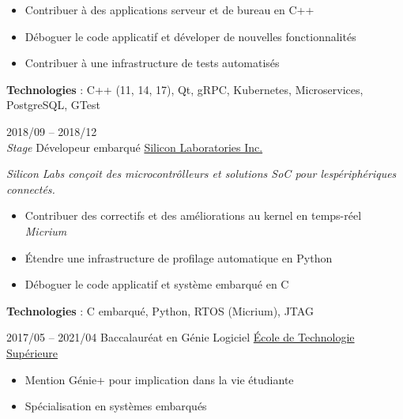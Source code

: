\documentclass[9pt]{developercv2} %
\begin{document}
\begin{entrylist}
{		\begin{itemize}
			\renewcommand{\labelitemi}{\raisebox{.45ex}{\rule{.6ex}{.6ex}}}
			\setlength\itemsep{-1pt}
			\item Contribuer à des applications serveur et de bureau en C++
			\item Déboguer le code applicatif et déveloper de nouvelles fonctionnalités
			\item Contribuer à une infrastructure de tests automatisés
		\end{itemize}

		\textbf{Technologies} : C++ (11, 14, 17), Qt, gRPC, Kubernetes, Microservices, PostgreSQL, GTest
	}
	\entry
	{2018/09 -- 2018/12\\\emph{Stage}}
	{Dévelopeur embarqué}
	{\href{https://www.silabs.com/}{Silicon Laboratories Inc.}}
	{
		\emph{
			Silicon Labs conçoit des microcontrôlleurs et solutions SoC pour lespériphériques connectés.
		}

		\begin{itemize}
			\renewcommand{\labelitemi}{\raisebox{.45ex}{\rule{.6ex}{.6ex}}}
			\setlength\itemsep{-1pt}
			\item Contribuer des correctifs et des améliorations au kernel en temps-réel \emph{Micrium}
			\item Étendre une infrastructure de profilage automatique en Python
			\item Déboguer le code applicatif et système embarqué en C
		\end{itemize}

		\textbf{Technologies} : C embarqué, Python, RTOS (Micrium), JTAG
	}
\end{entrylist}

\begin{entrylist}
	\setlength\itemsep{-1pt}
	\entry
	{2017/05 -- 2021/04}
	{Baccalauréat en Génie Logiciel}
	{\href{https://etsmtl.ca}{École de Technologie Supérieure}}
	{
		\vspace{-14pt}
		\begin{itemize}
			\renewcommand{\labelitemi}{\raisebox{.45ex}{\rule{.6ex}{.6ex}}}
			\setlength\itemsep{-1pt}
			\item Mention Génie+ pour implication dans la vie étudiante
			\item Spécialisation en systèmes embarqués
		\end{itemize}
	}
\end{entrylist}
\end{document}
